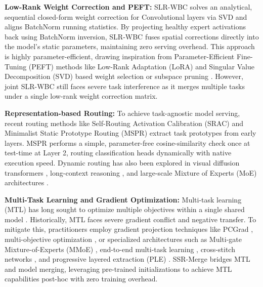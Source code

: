 \documentclass{article}
\theoremstyle{plain}
\theoremstyle{definition}
\theoremstyle{remark}
\begin{document}
\textbf{Low-Rank Weight Correction and PEFT:} SLR-WBC \cite{slrwbc2026} solves an analytical, sequential closed-form weight correction for Convolutional layers via SVD and aligns BatchNorm running statistics. By projecting healthy expert activations back using BatchNorm inversion, SLR-WBC fuses spatial corrections directly into the model's static parameters, maintaining zero serving overhead. This approach is highly parameter-efficient, drawing inspiration from Parameter-Efficient Fine-Tuning (PEFT) methods like Low-Rank Adaptation (LoRA) \cite{gao2024parameterefficient, wang2024loraga} and Singular Value Decomposition (SVD) based weight selection or subspace pruning \cite{kim2025robust, zeng2020sdlda}. However, joint SLR-WBC still faces severe task interference as it merges multiple tasks under a single low-rank weight correction matrix.

\textbf{Representation-based Routing:} To achieve task-agnostic model serving, recent routing methods like Self-Routing Activation Calibration (SRAC) and Minimalist Static Prototype Routing (MSPR) \cite{mspr2026} extract task prototypes from early layers. MSPR performs a simple, parameter-free cosine-similarity check once at test-time at Layer 2, routing classification heads dynamically with native execution speed. Dynamic routing has also been explored in visual diffusion transformers \cite{sha2026sparse}, long-context reasoning \cite{wu2025unlocking}, and large-scale Mixture of Experts (MoE) architectures \cite{zhou2022mixtureofexperts, zhou2024mvmoe, chen2025symbolic, bandarkar2025multilingual, wang2025badmoe, yuan2025expert, li2025r2t2, liu2022fewshot}.

\textbf{Multi-Task Learning and Gradient Optimization:} Multi-task learning (MTL) has long sought to optimize multiple objectives within a single shared model \cite{ruder2017anoverview, zhang2017asurvey}. Historically, MTL faces severe gradient conflict and negative transfer. To mitigate this, practitioners employ gradient projection techniques like PCGrad \cite{yu2020gradient}, multi-objective optimization \cite{sener2018multitask}, or specialized architectures such as Multi-gate Mixture-of-Experts (MMoE) \cite{ma2018modeling, chen2023minigptv2}, end-to-end multi-task learning \cite{liu2018endtoend, zhang2014facial}, cross-stitch networks \cite{misra2016crossstitch}, and progressive layered extraction (PLE) \cite{tang2020progressive, evgeniou2004regularized, liu2021conflictaverse}. SSR-Merge bridges MTL and model merging, leveraging pre-trained initializations to achieve MTL capabilities post-hoc with zero training overhead.
\end{document}
